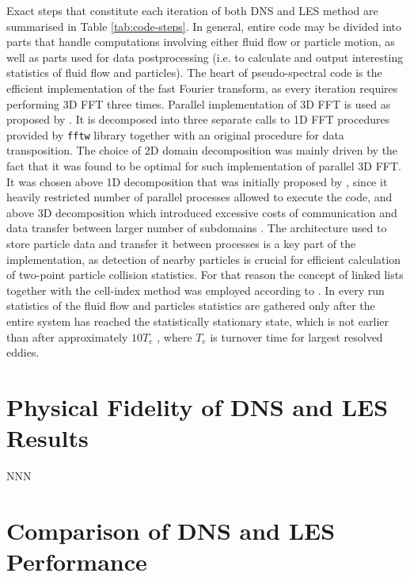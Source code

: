 \documentclass{pracamgren}
\begin{document}
Exact steps that constitute each iteration of both DNS and LES method are summarised in Table \ref{tab:code-steps}.
In general, entire code may be divided into parts that handle computations involving either fluid flow or particle motion, as well as parts used for data postprocessing (i.e. to calculate and output interesting statistics of fluid flow and particles).
The heart of pseudo-spectral code is the efficient implementation of the fast Fourier transform, as every iteration requires performing 3D FFT three times.
Parallel implementation of 3D FFT is used as proposed by \textcite{Ayala2013}.
It is decomposed into three separate calls to 1D FFT procedures provided by \texttt{fftw} library together with an original procedure for data transposition.
The choice of 2D domain decomposition was mainly driven by the fact that it was found to be optimal for such implementation of parallel 3D FFT.  
It was chosen above 1D decomposition that was initially proposed by \textcite{Dmitruk2001}, since it heavily restricted number of parallel processes allowed to execute the code, and above 3D decomposition which introduced excessive costs of communication and data transfer between larger number of subdomains \parencite{Ayala2013}.   
The architecture used to store particle data and transfer it between processes is a key part of the implementation, as detection of nearby particles is crucial for efficient calculation of two-point particle collision statistics.
For that reason the concept of linked lists together with the cell-index method was employed according to \textcite[p. 149--152]{Allen1987}.
In every run statistics of the fluid flow and particles statistics are gathered only after the entire system has reached the statistically stationary state, which is not earlier than after approximately $10 T_e$ \parencite{Rosa2017}, where $T_e$ is turnover time for largest resolved eddies.  



\chapter{Physical Fidelity of DNS and LES Results}
\label{ch:ch2}

NNN



\chapter{Comparison of DNS and LES Performance}
\label{ch:ch3}
\end{document}
